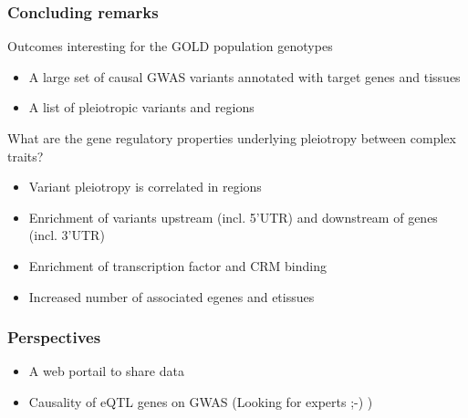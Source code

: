 \documentclass{beamer}
\begin{document}
        \begin{frame}
            \frametitle{Concluding remarks}

            Outcomes interesting for the GOLD population genotypes
%
            \begin{itemize}
                \item A large set of causal GWAS variants annotated with target genes and tissues
                \item A list of pleiotropic variants and regions
            \end{itemize}
%
            \vfill
%
            What are the gene regulatory properties underlying pleiotropy between complex traits?
%
            \begin{itemize}
                \item Variant pleiotropy is correlated in regions
                \item Enrichment of variants upstream (incl. 5'UTR) and downstream of genes (incl. 3'UTR)
                \item Enrichment of transcription factor and CRM binding
                \item Increased number of associated egenes and etissues
            \end{itemize}


        \end{frame}

        \begin{frame}
            \frametitle{Perspectives}


            \begin{itemize}
                \item A web portail to share data
                \item Causality of eQTL genes on GWAS (Looking for experts ;-) )
            \end{itemize}

        \end{frame}
\end{document}
